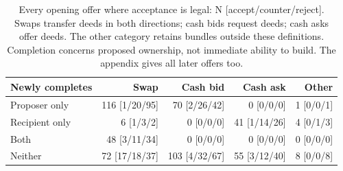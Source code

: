 \begin{table}[t]\centering\small
\begin{tabular}{@{}lrrrr@{}}\toprule
Newly completes & Swap & Cash bid & Cash ask & Other\\\midrule
Proposer only & 116 [1/20/95] & 70 [2/26/42] & 0 [0/0/0] & 1 [0/0/1] \\
Recipient only & 6 [1/3/2] & 0 [0/0/0] & 41 [1/14/26] & 4 [0/1/3] \\
Both & 48 [3/11/34] & 0 [0/0/0] & 0 [0/0/0] & 0 [0/0/0] \\
Neither & 72 [17/18/37] & 103 [4/32/67] & 55 [3/12/40] & 8 [0/0/8] \\
\bottomrule\end{tabular}
\caption{Every opening offer where acceptance is legal: N [accept/counter/reject]. Swaps transfer deeds in both directions; cash bids request deeds; cash asks offer deeds. The other category retains bundles outside these definitions. Completion concerns proposed ownership, not immediate ability to build. The appendix gives all later offers too.}\label{tab:opening-all}
\end{table}
